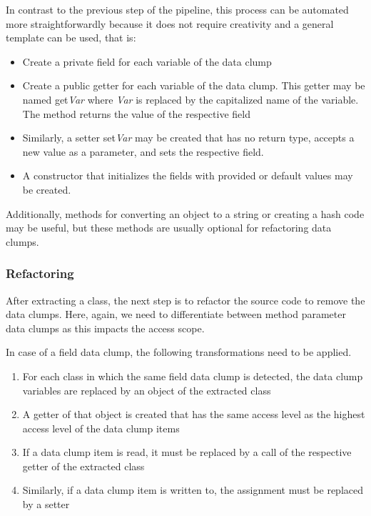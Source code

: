 In contrast to the previous step of the pipeline, this process can be automated more straightforwardly because it does not require creativity and a general template can be used, that is:
\begin{itemize}
    \item Create a private field for each variable of the data clump
    \item Create a public getter for each variable of the data clump. This getter may be named get\textit{Var} where \textit{Var} is replaced by the capitalized name of the variable. The method returns the value of the respective field
    \item Similarly, a setter set\textit{Var} may be created that has no return type, accepts a new value as a parameter, and sets the respective field. 
    \item A constructor that initializes the fields with provided or default values may be created. 
\end{itemize}

Additionally, methods for converting an object to a string or creating a hash code may be useful, but these methods are usually optional for refactoring data clumps. 


\subsubsection{Refactoring}
After extracting a class, the next step is to refactor the source code to remove the data clumps. Here, again, we need to differentiate between method parameter data clumps as this impacts the access scope. 

In case of a field data clump, the following transformations need to be applied.

\begin{enumerate}
    \item For each class in which the same field data clump is detected, the data clump variables are replaced by an object of the extracted class
    \item A getter of that object is created that has the same access level as the highest access level of the data clump items
    \item If a data clump item is read, it must be replaced by a call of the respective getter of the extracted class
    \item Similarly, if a data clump item is written to, the assignment must be replaced by a setter
\end{enumerate}



